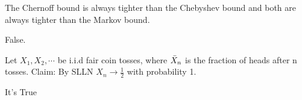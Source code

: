 \documentclass[tf-tutorial-all.tex]{subfiles}
\begin{document}
\begin{truefalse}
The Chernoff bound is always tighter than the Chebyshev bound and both are always tighter than the Markov bound.
\begin{solution}
False.
\end{solution}
\end{truefalse}

\begin{truefalse}
Let $X_1, X_2, \cdots$ be i.i.d fair coin tosses, where $\Bar{X}_n$ is the fraction of heads after n tosses. 
Claim: By SLLN $X_n \rightarrow \frac{1}{2}$ with probability 1. 
\begin{solution}
It's True
\end{solution}
\end{truefalse}
\end{document}
